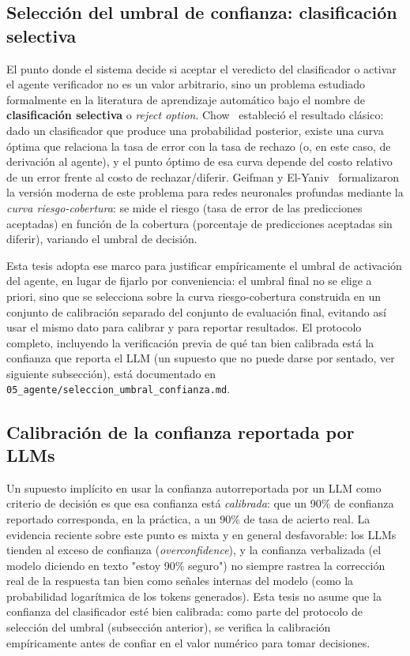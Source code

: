 \subsection{Selección del umbral de confianza: clasificación selectiva}

El punto donde el sistema decide si aceptar el veredicto del clasificador o activar el agente verificador no es un valor arbitrario, sino un problema estudiado formalmente en la literatura de aprendizaje automático bajo el nombre de \textbf{clasificación selectiva} o \textit{reject option}. Chow~\cite{Chow1970} estableció el resultado clásico: dado un clasificador que produce una probabilidad posterior, existe una curva óptima que relaciona la tasa de error con la tasa de rechazo (o, en este caso, de derivación al agente), y el punto óptimo de esa curva depende del costo relativo de un error frente al costo de rechazar/diferir. Geifman y El-Yaniv~\cite{GeifmanElYaniv2017} formalizaron la versión moderna de este problema para redes neuronales profundas mediante la \textit{curva riesgo-cobertura}: se mide el riesgo (tasa de error de las predicciones aceptadas) en función de la cobertura (porcentaje de predicciones aceptadas sin diferir), variando el umbral de decisión.

Esta tesis adopta ese marco para justificar empíricamente el umbral de activación del agente, en lugar de fijarlo por conveniencia: el umbral final no se elige a priori, sino que se selecciona sobre la curva riesgo-cobertura construida en un conjunto de calibración separado del conjunto de evaluación final, evitando así usar el mismo dato para calibrar y para reportar resultados. El protocolo completo, incluyendo la verificación previa de qué tan bien calibrada está la confianza que reporta el LLM (un supuesto que no puede darse por sentado, ver siguiente subsección), está documentado en \texttt{05\_agente/seleccion\_umbral\_confianza.md}.

\subsection{Calibración de la confianza reportada por LLMs}

Un supuesto implícito en usar la confianza autorreportada por un LLM como criterio de decisión es que esa confianza está \textit{calibrada}: que un 90\% de confianza reportado corresponda, en la práctica, a un 90\% de tasa de acierto real. La evidencia reciente sobre este punto es mixta y en general desfavorable: los LLMs tienden al exceso de confianza (\textit{overconfidence}), y la confianza verbalizada (el modelo diciendo en texto "estoy 90\% seguro") no siempre rastrea la corrección real de la respuesta tan bien como señales internas del modelo (como la probabilidad logarítmica de los tokens generados). Esta tesis no asume que la confianza del clasificador esté bien calibrada: como parte del protocolo de selección del umbral (subsección anterior), se verifica la calibración empíricamente antes de confiar en el valor numérico para tomar decisiones.

